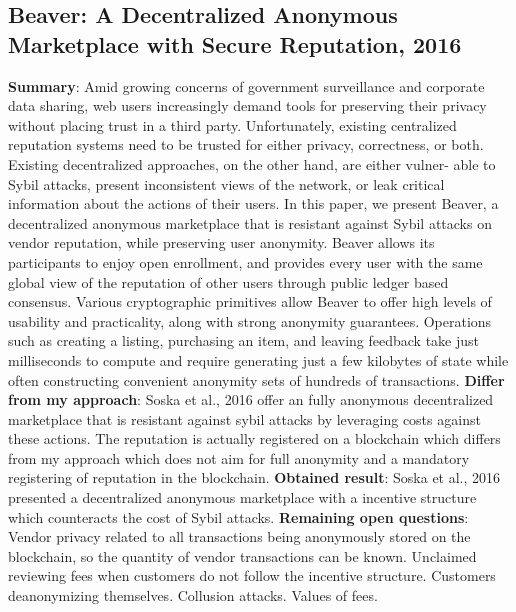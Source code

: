 \documentclass[11pt]{article}
\begin{document}
\subsection{Beaver: A Decentralized Anonymous Marketplace with Secure Reputation, 2016 \cite{decentralizedAnonymousReputation}}
\textbf{Summary}: Amid growing concerns of government surveillance and corporate data sharing, web users increasingly demand tools for preserving their privacy without placing trust in a third party. Unfortunately, existing centralized reputation systems need to be trusted for either privacy, correctness, or both. Existing decentralized approaches, on the other hand, are either vulner- able to Sybil attacks, present inconsistent views of the network, or leak critical information about the actions of their users. In this paper, we present Beaver, a decentralized anonymous marketplace that is resistant against Sybil attacks on vendor reputation, while preserving user anonymity. Beaver allows its participants to enjoy open enrollment, and provides every user with the same global view of the reputation of other users through public ledger based consensus. Various cryptographic primitives allow Beaver to offer high levels of usability and practicality, along with strong anonymity guarantees. Operations such as creating a listing, purchasing an item, and leaving feedback take just milliseconds to compute and require generating just a few kilobytes of state while often constructing convenient anonymity sets of hundreds of transactions.\newline
\textbf{Differ from my approach}: Soska et al., 2016 offer an fully anonymous decentralized marketplace that is resistant against sybil attacks by leveraging costs against these actions. The reputation is actually registered on a blockchain which differs from my approach which does not aim for full anonymity and a mandatory registering of reputation in the blockchain. \newline
\textbf{Obtained result}: Soska et al., 2016 presented a decentralized anonymous marketplace with a incentive structure which counteracts the cost of Sybil attacks.\newline
\textbf{Remaining open questions}: Vendor privacy related to all transactions being anonymously stored on the blockchain, so the quantity of vendor transactions can be known. Unclaimed reviewing fees when customers do not follow the incentive structure. Customers deanonymizing themselves. Collusion attacks. Values of fees. \newline
\end{document}
